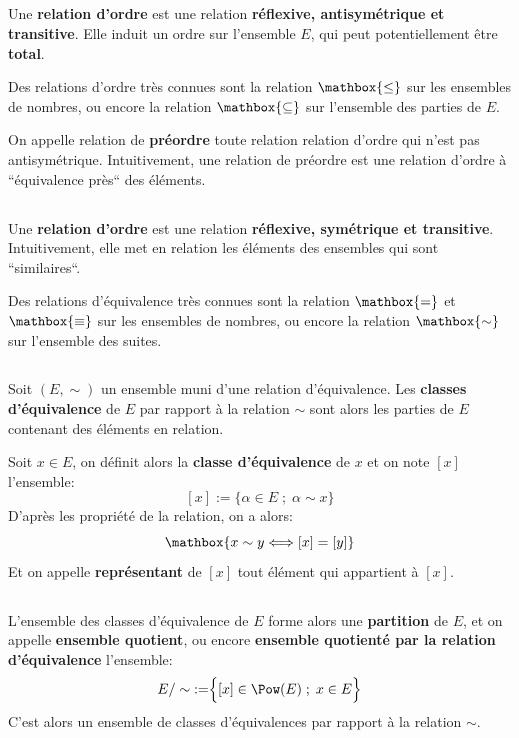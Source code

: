 \subsection*{}
Une \textbf{relation d'ordre} est une relation \textbf{réflexive, antisymétrique et transitive}. Elle induit un ordre sur l'ensemble \(E\), qui peut potentiellement être \textbf{total}.\<

Des relations d'ordre très connues sont la relation \(\mathbox{\leq}\) sur les ensembles de nombres, ou encore la relation \(\mathbox{\subseteq}\) sur l'ensemble des parties de \(E\).\<

On appelle relation de \textbf{préordre} toute relation relation d'ordre qui n'est pas antisymétrique. Intuitivement, une relation de préordre est une relation d'ordre à ``équivalence près`` des éléments.

\subsection*{}
Une \textbf{relation d'ordre} est une relation \textbf{réflexive, symétrique et transitive}. Intuitivement, elle met en relation les éléments des ensembles qui sont ``similaires``.\<

Des relations d'équivalence très connues sont la relation \(\mathbox{=}\) et \(\mathbox{\equiv}\) sur les ensembles de nombres, ou encore la relation \(\mathbox{\sim}\) sur l'ensemble des suites.\<

\subsection*{}
Soit \((E, \sim)\) un ensemble muni d'une relation d'équivalence.\+
Les \textbf{classes d'équivalence} de \(E\) par rapport à la relation \(\sim\) sont alors les parties de \(E\) contenant des éléments en relation.\<

Soit \(x \in E\), on définit alors la \textbf{classe d'équivalence} de \(x\) et on note \([x]\) l'ensemble:
\[
    [x] := \Bigr\{ \alpha \in E \; ; \; \alpha \sim x \Bigr\}
\]
D'après les propriété de la relation, on a alors:
\[
    \mathbox{
        x \sim y \Longleftrightarrow [x] = [y]
    }
\]
Et on appelle \textbf{représentant} de \([x]\) tout élément qui appartient à \([x]\).

\subsection*{}
L'ensemble des classes d'équivalence de \(E\) forme alors une \textbf{partition} de \(E\), et on appelle \textbf{ensemble quotient}, ou encore \textbf{ensemble quotienté par la relation d'équivalence} l'ensemble:
\[
    E / \sim \; := \Bigr\{ [x] \in \Pow(E) \; ; \; x \in E \Bigr\}
\]
C'est alors un ensemble de classes d'équivalences par rapport à la relation \(\sim\).\<

